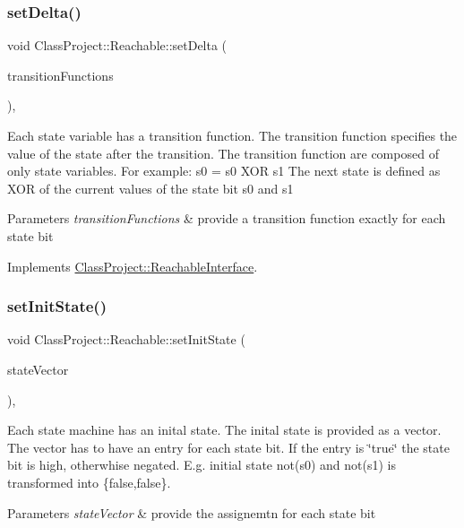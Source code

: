 \subsubsection{\texorpdfstring{set\+Delta()}{setDelta()}}
{\footnotesize\ttfamily void Class\+Project\+::\+Reachable\+::set\+Delta (\begin{DoxyParamCaption}\item[{const std\+::vector$<$ B\+D\+D\+\_\+\+ID $>$ \&}]{transition\+Functions }\end{DoxyParamCaption})\hspace{0.3cm}{\ttfamily [override]}, {\ttfamily [virtual]}}

Each state variable has a transition function. The transition function specifies the value of the state after the transition. The transition function are composed of only state variables. For example\+: s0\textquotesingle{} = s0 X\+OR s1 The next state is defined as X\+OR of the current values of the state bit s0 and s1 
\begin{DoxyParams}{Parameters}
{\em transition\+Functions} & provide a transition function exactly for each state bit \\
\hline
\end{DoxyParams}


Implements \hyperlink{classClassProject_1_1ReachableInterface_a88f9a34f7272c3f971e757aa2b140746}{Class\+Project\+::\+Reachable\+Interface}.

\mbox{\label{classClassProject_1_1Reachable_ab3ddc3f569e280c3902a40ab8202f8c3}} 
\subsubsection{\texorpdfstring{set\+Init\+State()}{setInitState()}}
{\footnotesize\ttfamily void Class\+Project\+::\+Reachable\+::set\+Init\+State (\begin{DoxyParamCaption}\item[{const std\+::vector$<$ bool $>$ \&}]{state\+Vector }\end{DoxyParamCaption})\hspace{0.3cm}{\ttfamily [override]}, {\ttfamily [virtual]}}

Each state machine has an inital state. The inital state is provided as a vector. The vector has to have an entry for each state bit. If the entry is \char`\"{}true\char`\"{} the state bit is high, otherwhise negated. E.\+g. initial state not(s0) and not(s1) is transformed into \{false,false\}. 
\begin{DoxyParams}{Parameters}
{\em state\+Vector} & provide the assignemtn for each state bit \\
\hline
\end{DoxyParams}



